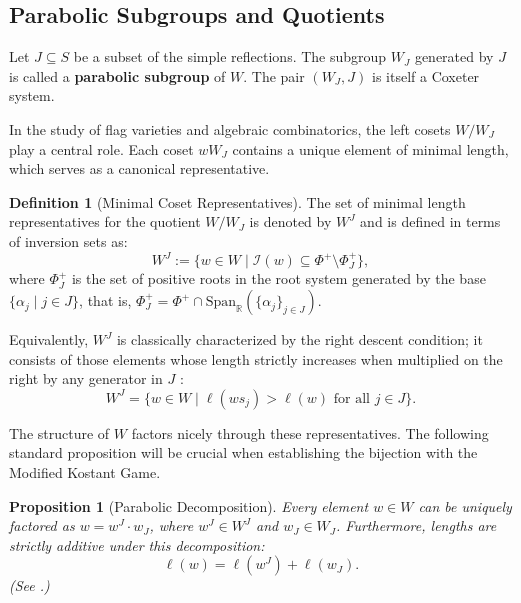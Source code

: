 \documentclass[11pt,a4paper]{amsart}
\theoremstyle{plain}
\newtheorem{proposition}[theorem]{Proposition}
\theoremstyle{definition}
\newtheorem{definition}[theorem]{Definition}
\theoremstyle{remark}
\begin{document}
\subsection{Parabolic Subgroups and Quotients}

Let $J \subseteq S$ be a subset of the simple reflections. The subgroup $W_J$ generated by $J$ is called a \textbf{parabolic subgroup} of $W$. The pair $(W_J, J)$ is itself a Coxeter system.

In the study of flag varieties and algebraic combinatorics, the left cosets $W/W_J$ play a central role. Each coset $wW_J$ contains a unique element of minimal length, which serves as a canonical representative.

\begin{definition}[Minimal Coset Representatives]
	The set of minimal length representatives for the quotient $W/W_J$ is denoted by $W^J$ and is defined in terms of inversion sets as:
	\begin{equation}
		W^J := \{w \in W \mid \mathcal{I}(w) \subseteq \Phi^+ \setminus \Phi_J^+\}, 
	\end{equation}
	where $\Phi_J^+$ is the set of positive roots in the root system generated by the base $\{\alpha_j \mid j \in J\}$, that is, $ \Phi_J^+ = \Phi^+ \cap \text{Span}_{\mathbb{R}}(\{\alpha_j\}_{j \in J})$.
 
    Equivalently, $W^J$ is classically characterized by the right descent condition; it consists of those elements whose length strictly increases when multiplied on the right by any generator in $J$ \cite[Proposition~2.4.4]{BjornerBrenti2005}:
    \begin{equation}
        W^J = \{w \in W \mid \ell(ws_j) > \ell(w) \text{ for all } j \in J\}.
    \end{equation}
\end{definition}

The structure of $W$ factors nicely through these representatives. The following standard proposition will be crucial when establishing the bijection with the Modified Kostant Game.

\begin{proposition}[Parabolic Decomposition] \label{prop:parabolic_decomp}
	Every element $w \in W$ can be uniquely factored as $w = w^J \cdot w_J$, where $w^J \in W^J$ and $w_J \in W_J$. Furthermore, lengths are strictly additive under this decomposition:
	\begin{equation}
		\ell(w) = \ell(w^J) + \ell(w_J).
	\end{equation}
	(See \cite[Proposition~2.4.4]{BjornerBrenti2005}.)
\end{proposition}
\end{document}
